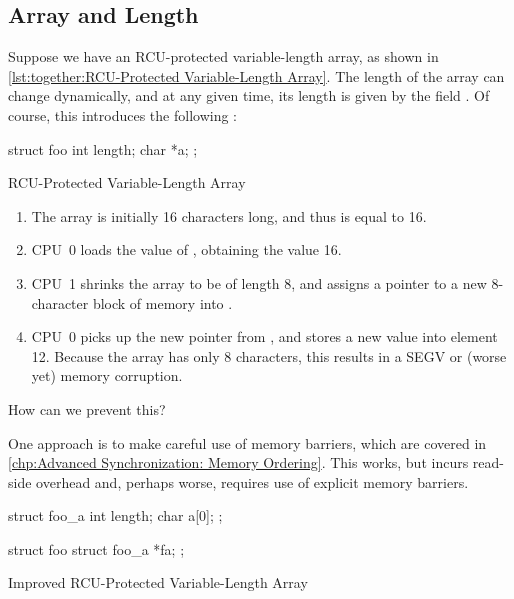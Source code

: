 \FloatBarrier
\subsection{Array and Length}
\label{sec:together:Array and Length}

Suppose we have an RCU-protected variable-length array, as shown in
\cref{lst:together:RCU-Protected Variable-Length Array}.
The length of the array  can change dynamically, and at any
given time, its length is given by the field .
Of course, this introduces the following :

\begin{listing}
\begin{VerbatimL}[tabsize=8]
struct foo {
	int length;
	char *a;
};
\end{VerbatimL}
\caption{RCU-Protected Variable-Length Array}
\label{lst:together:RCU-Protected Variable-Length Array}
\end{listing}

\begin{enumerate}
\item	The array is initially 16 characters long, and thus 
	is equal to 16.
\item	CPU~0 loads the value of , obtaining the value 16.
\item	CPU~1 shrinks the array to be of length 8, and assigns a pointer
	to a new 8-character block of memory into .
\item	CPU~0 picks up the new pointer from , and stores a
	new value into element 12.
	Because the array has only 8 characters, this results in
	a SEGV or (worse yet) memory corruption.
\end{enumerate}

How can we prevent this?

One approach is to make careful use of memory barriers, which are
covered in \cref{chp:Advanced Synchronization: Memory Ordering}.
This works, but incurs read-side overhead and, perhaps worse, requires
use of explicit memory barriers.

\begin{listing}
\begin{VerbatimL}[tabsize=8]
struct foo_a {
	int length;
	char a[0];
};

struct foo {
	struct foo_a *fa;
};
\end{VerbatimL}
\caption{Improved RCU-Protected Variable-Length Array}
\label{lst:together:Improved RCU-Protected Variable-Length Array}
\end{listing}

